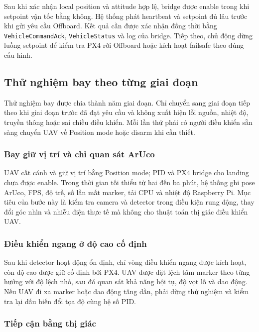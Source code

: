 Sau khi xác nhận local position và attitude hợp lệ, bridge được enable trong khi setpoint vận tốc bằng không. Hệ thống phát heartbeat và setpoint đủ lâu trước khi gửi yêu cầu Offboard. Kết quả cần được xác nhận đồng thời bằng \texttt{VehicleCommandAck}, \texttt{VehicleStatus} và log của bridge. Tiếp theo, chủ động dừng luồng setpoint để kiểm tra PX4 rời Offboard hoặc kích hoạt failsafe theo đúng cấu hình.

\subsection{Thử nghiệm bay theo từng giai đoạn}

Thử nghiệm bay được chia thành năm giai đoạn. Chỉ chuyển sang giai đoạn tiếp theo khi giai đoạn trước đã đạt yêu cầu và không xuất hiện lỗi nguồn, nhiệt độ, truyền thông hoặc sai chiều điều khiển. Mỗi lần thử phải có người điều khiển sẵn sàng chuyển UAV về Position mode hoặc disarm khi cần thiết.

\subsubsection{Bay giữ vị trí và chỉ quan sát ArUco}

UAV cất cánh và giữ vị trí bằng Position mode; PID và PX4 bridge cho landing chưa được enable. Trong thời gian tối thiểu từ hai đến ba phút, hệ thống ghi pose ArUco, FPS, độ trễ, số lần mất marker, tải CPU và nhiệt độ Raspberry Pi. Mục tiêu của bước này là kiểm tra camera và detector trong điều kiện rung động, thay đổi góc nhìn và nhiễu điện thực tế mà không cho thuật toán thị giác điều khiển UAV.

\subsubsection{Điều khiển ngang ở độ cao cố định}

Sau khi detector hoạt động ổn định, chỉ vòng điều khiển ngang được kích hoạt, còn độ cao được giữ cố định bởi PX4. UAV được đặt lệch tâm marker theo từng hướng với độ lệch nhỏ, sau đó quan sát khả năng hội tụ, độ vọt lố và dao động. Nếu UAV đi xa marker hoặc dao động tăng dần, phải dừng thử nghiệm và kiểm tra lại dấu biến đổi tọa độ cùng hệ số PID.

\subsubsection{Tiếp cận bằng thị giác}

